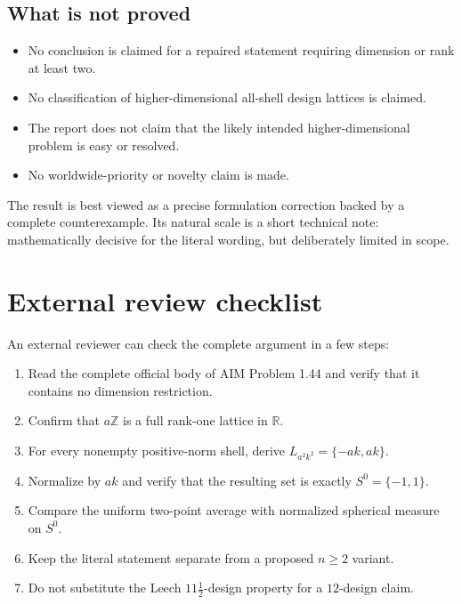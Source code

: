 \documentclass[11pt]{article}
\theoremstyle{argusplain}
\begin{document}
\subsection{What is not proved}

\begin{scopebox}
\begin{itemize}
  \item No conclusion is claimed for a repaired statement requiring dimension or rank at least two.
  \item No classification of higher-dimensional all-shell design lattices is claimed.
  \item The report does not claim that the likely intended higher-dimensional problem is easy or resolved.
  \item No worldwide-priority or novelty claim is made.
\end{itemize}
\end{scopebox}

The result is best viewed as a precise formulation correction backed by a complete counterexample. Its natural scale is a short technical note: mathematically decisive for the literal wording, but deliberately limited in scope.

\clearpage
\section{External review checklist}

An external reviewer can check the complete argument in a few steps:
\begin{enumerate}
  \item Read the complete official body of AIM Problem 1.44 and verify that it contains no dimension restriction.
  \item Confirm that $a\mathbb Z$ is a full rank-one lattice in $\mathbb R$.
  \item For every nonempty positive-norm shell, derive $L_{a^2k^2}=\{-ak,ak\}$.
  \item Normalize by $ak$ and verify that the resulting set is exactly $S^0=\{-1,1\}$.
  \item Compare the uniform two-point average with normalized spherical measure on $S^0$.
  \item Keep the literal statement separate from a proposed $n\geq2$ variant.
  \item Do not substitute the Leech $11\tfrac12$-design property for a $12$-design claim.
\end{enumerate}
\end{document}
